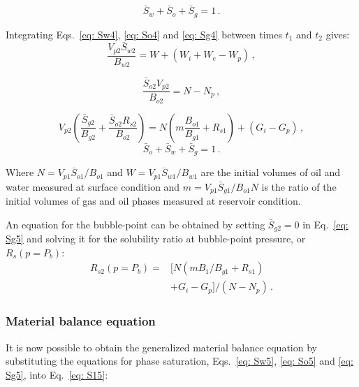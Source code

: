\documentclass[authoryear,preprint,review,11pt]{elsarticle}
\begin{document}
\begin{equation}\label{eq: S14}
\bar{S}_w+\bar{S}_o+\bar{S}_g=1 \, .
\end{equation}

Integrating Eqs.~\eqref{eq: Sw4}, \eqref{eq: So4} and \eqref{eq: Sg4} between times $t_1$ and $t_2$ gives:
\begin{equation}\label{eq: Sw5}
\frac{V_{p2} \bar{S}_{w2}}{B_{w2}}=W+\left(W_i+W_e-W_p\right) \, ,
\end{equation}

\begin{equation}\label{eq: So5}
\frac{\bar{S}_{o2} V_{p2}}{B_{o2}} = N-N_p \, ,
\end{equation}

\begin{equation}\label{eq: Sg5}
V_{p2}\left(\frac{\bar{S}_{g2}}{B_{g2}} +\frac{\bar{S}_{o2} R_{s2}}{B_{o2}}\right) = N\left(m\frac{B_{o1}}{B_{g1}} + R_{s1}\right) +\left(G_i-G_p\right) \, ,
\end{equation}
%
\begin{equation}\label{eq: S15}
\bar{S}_o+\bar{S}_w+\bar{S}_g=1 \, .
\end{equation}

Where $N=V_{p1} \bar{S}_{o1}/B_{o1}$ and $W=V_{p1} \bar{S}_{w1}/B_{w1}$ are the initial volumes of oil and water measured at surface condition and $m=V_{p1} \bar{S}_{g1}/B_{o1} N$ is the ratio of the initial volumes of gas and oil phases measured at reservoir condition.

An equation for the bubble-point can be obtained by setting $\bar{S}_{g2}=0$ in Eq.~\eqref{eq: Sg5} and solving it for the solubility ratio at bubble-point pressure, or $R_s(p=P_b)$:
\begin{equation}\label{eq: eqPb}
\begin{split}
R_{s2}\left(p=P_b\right) = &\Big[N\left(m B_{1}/B_{g1} +R_{s1}\right)\\
&+G_i-G_p\Big]/\left(N-N_p\right) \, .
\end{split}
\end{equation}

\subsubsection{Material balance equation}

It is now possible to obtain the generalized material balance equation by substituting the equations for phase saturation, Eqs.~\eqref{eq: Sw5}, \eqref{eq: So5} and \eqref{eq: Sg5}, into Eq.~\eqref{eq: S15}:  
\end{document}
